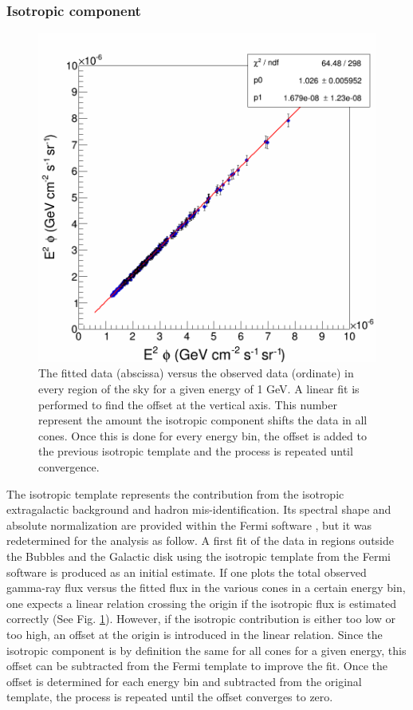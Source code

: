 \subsubsection{Isotropic component}

\begin{figure}
 \centering
 \includegraphics[width=.5\linewidth]{pic/method/iso_calibration.png}
 \caption{The fitted data (abscissa) versus the observed data (ordinate) in every region of the sky for a given energy of 1 GeV. A linear fit is performed to find the offset at the vertical axis. This number represent the amount the isotropic component shifts the data in all cones. Once this is done for every energy bin, the offset is added to the previous isotropic template and the process is repeated until convergence.}
 \label{fig:iso_calibration}
\end{figure}


The isotropic template represents the contribution from the isotropic extragalactic background and hadron mis-identification. Its spectral shape and absolute normalization are provided within the Fermi software , but it was redetermined for the analysis as follow.
A first fit of the data in regions outside the Bubbles and the Galactic disk using the isotropic template from the Fermi software is produced as an initial estimate. If one plots the total observed gamma-ray flux versus the fitted flux in the various cones in a certain energy bin, one expects a linear relation crossing the origin if the isotropic flux is estimated correctly (See Fig. \ref{fig:iso_calibration}). 
However, if the isotropic contribution is either too low or too high, an offset at the origin is introduced in the linear relation. Since the isotropic component is by definition the same for all cones for a given energy, this offset can be subtracted from the Fermi template to improve the fit.
Once the offset is determined for each energy bin and subtracted from the original template, the process is repeated until the offset converges to zero.

